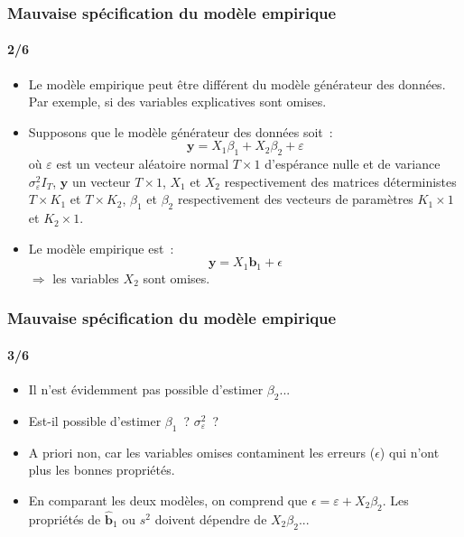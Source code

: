 \documentclass[10pt]{beamer}
\begin{document}
\begin{frame}
  \frametitle{Mauvaise spécification du modèle empirique}
  \framesubtitle{2/6}

  \begin{itemize}

  \item Le modèle empirique peut être différent du modèle générateur des données. Par exemple, si des variables explicatives sont omises.\newline

  \item Supposons que le modèle générateur des données soit~:
    \[
      \mathbf y = X_1\beta_1 + X_2\beta_2 + \varepsilon
    \]
    où $\varepsilon$ est un vecteur aléatoire normal $T\times 1$ d'espérance nulle et de variance $\sigma_{\varepsilon}^2I_T$, $\mathbf y$ un vecteur $T\times 1$, $X_1$ et $X_2$ respectivement des matrices déterministes $T\times K_1$ et $T\times K_2$, $\beta_1$ et $\beta_2$ respectivement des vecteurs de paramètres $K_1\times 1$ et $K_2\times 1$.\newline

  \item Le modèle empirique est~:
    \[
      \mathbf y = X_1\mathbf b_1 + \epsilon
    \]
    $\Rightarrow$ les variables $X_2$ sont omises.

  \end{itemize}

\end{frame}


\begin{frame}
  \frametitle{Mauvaise spécification du modèle empirique}
  \framesubtitle{3/6}

  \begin{itemize}

  \item Il n'est évidemment pas possible d'estimer $\beta_2$...\newline

  \item Est-il possible d'estimer $\beta_1$~? $\sigma_{\varepsilon}^2$~?\newline

  \item A priori non, car les variables omises contaminent les erreurs
    ($\epsilon$) qui n'ont plus les bonnes propriétés.\newline

  \item En comparant les deux modèles, on comprend
    que $\epsilon = \varepsilon + X_2\beta_2$. Les propriétés
    de $\hat{\mathbf b}_1$ ou $s^2$ doivent dépendre
    de $X_2\beta_2$...

  \end{itemize}

\end{frame}
\end{document}
